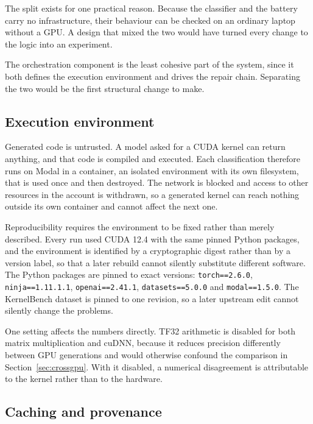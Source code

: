 \documentclass[12pt]{article}
\begin{document}
The split exists for one practical reason. Because the classifier and the
battery carry no infrastructure, their behaviour can be checked on an ordinary
laptop without a GPU. A design that mixed the two would have turned every
change to the logic into an experiment.



The orchestration component is the least cohesive part of the system, since it
both defines the execution environment and drives the repair chain. Separating
the two would be the first structural change to make.

\FloatBarrier
\subsection{Execution environment}

Generated code is untrusted. A model asked for a CUDA kernel can return
anything, and that code is compiled and executed. Each classification therefore
runs on Modal in a container, an isolated environment with its own filesystem,
that is used once and then destroyed. The network is blocked and access to
other resources in the account is withdrawn, so a generated kernel can reach
nothing outside its own container and cannot affect the next one.

Reproducibility requires the environment to be fixed rather than merely
described. Every run used CUDA 12.4 with the same pinned Python packages, and
the environment is identified by a cryptographic digest rather than by a
version label, so that a later rebuild cannot silently substitute different
software. The Python packages are pinned
to exact versions: \texttt{torch==2.6.0}, \texttt{ninja==1.11.1.1},
\texttt{openai==2.41.1}, \texttt{datasets==5.0.0} and \texttt{modal==1.5.0}.
The KernelBench dataset is pinned to one revision, so a later upstream edit
cannot silently change the problems.

One setting affects the numbers directly. TF32 arithmetic is disabled for both
matrix multiplication and cuDNN, because it reduces precision differently
between GPU generations and would otherwise confound the comparison in
Section~\ref{sec:crossgpu}. With it disabled, a numerical disagreement is
attributable to the kernel rather than to the hardware.

\subsection{Caching and provenance}
\end{document}
